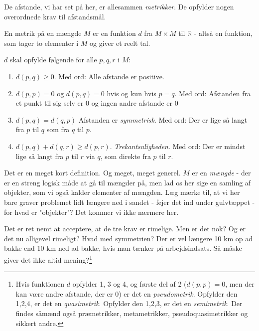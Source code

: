 \documentclass[a4paper, 12pt]{article}
\theoremstyle{remark}
\begin{document}
De afstande, vi har set på her, er allesammen \emph{metrikker}. De opfylder nogen overordnede krav til afstandsmål. 
\begin{tcolorbox}[title=Metrik]
En metrik på en mængde $M$ er en funktion $d$ fra $M\times M$  til $\mathbb{R}$ - altså en funktion, som tager to elementer  i $M$ og giver et reelt tal.

$d$ skal opfylde følgende for alle $p,q,r$ i $M$:
\begin{enumerate}
\item $d(p,q)\geq 0$. Med ord: Alle afstande er positive.
\item $d(p,p)=0$ og $d(p,q)=0$ hvis og kun hvis $p=q$.  Med ord: Afstanden fra et punkt til sig selv er $0$ og ingen andre afstande er $0$
\item $d(p,q)=d(q,p)$ Afstanden er \emph{symmetrisk}. Med ord: Der er lige så langt fra $p$ til $q$ som fra $q$ til $p$.
\item $d(p,q)+d(q,r)\geq d(p,r)$. \emph{Trekantsuligheden}. Med ord:  Der er mindst lige så langt fra $p$ til $ r$ via $q$, som direkte fra $p$ til $r$. 
\end{enumerate}
\end{tcolorbox}

Det er en meget kort definition. Og meget, meget generel. $M$ er en \emph{mængde} - der er en streng logisk måde at gå til mængder på, men lad os her sige en samling af objekter, som vi også kalder elementer af mængden. Læg mærke til, at vi her bare graver problemet lidt længere ned i sandet - fejer det ind under gulvtæppet - for hvad er "objekter"?  Det kommer vi ikke nærmere her. 

Det er ret nemt at acceptere, at de tre krav er rimelige. Men er det nok? Og er det nu alligevel rimeligt? Hvad med symmetrien? Der er vel længere 10 km op ad bakke end 10 km ned ad bakke, hvis man tænker på arbejdsindsats. Så måske giver det ikke altid mening?\footnote{ Hvis funktionen $d$ opfylder 1, 3 og 4, og første del af 2 ($d(p,p)=0$, men der kan være andre afstande, der er $0$)  er det en \emph{pseudometrik}. Opfylder den 1,2,4, er det en \emph{quasimetrik}. Opfylder den 1,2,3, er det en \emph{semimetrik}. Der findes såmænd også præmetrikker, metametrikker, pseudoquasimetrikker og sikkert andre. }
\end{document}
